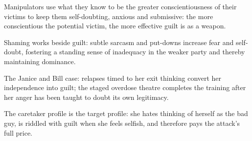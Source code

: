 

\begin{distilled}
  \item Manipulators use what they know to be the greater conscientiousness of their victims to keep them self-doubting, anxious and submissive: the more conscientious the potential victim, the more effective guilt is as a weapon.
  \item Shaming works beside guilt: subtle sarcasm and put-downs increase fear and self-doubt, fostering a standing sense of inadequacy in the weaker party and thereby maintaining dominance.
  \item The Janice and Bill case: relapses timed to her exit thinking convert her independence into guilt; the staged overdose theatre completes the training after her anger has been taught to doubt its own legitimacy.
  \item The caretaker profile is the target profile: she hates thinking of herself as the bad guy, is riddled with guilt when she feels selfish, and therefore pays the attack's full price.
\end{distilled}
